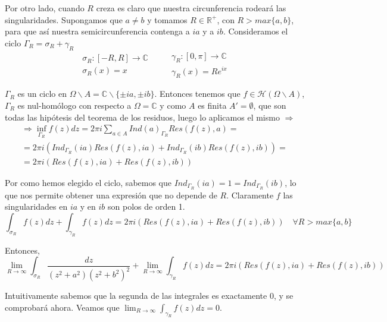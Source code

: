 \documentclass{article}
\begin{document}
Por otro lado, cuando $R$ creza es claro que nuestra circunferencia rodeará las singularidades. Supongamos que $a\neq b$ y tomamos $R\in \mathbb{R}^+$, con $R>max\{a,b\}$, para que así nuestra semicircunferencia contenga a $ia$ y a $ib$. Consideramos el ciclo $\Gamma_R=\sigma_R+\gamma_R$
\begin{equation*}
\left.\begin{array}{c}
\sigma_{R}:[-R,R]\longrightarrow \mathbb{C}\\
\sigma_{R}(x)=x
\end{array}\right.\qquad \left.\begin{array}{c}
\gamma_{R}:[0,\pi]\longrightarrow \mathbb{C}\\
\gamma_{R}(x)=Re^{ix}
\end{array}\right.
\end{equation*}

$\Gamma_R$ es un ciclo en $\Omega\backslash A=\mathbb{C}\backslash \{\pm ia,\pm ib\}$. Entonces tenemos que $f\in \mathcal{H}(\Omega\backslash A)$, $\Gamma_R$ es nul-homólogo con respecto a $\Omega=\mathbb{C}$ y como $A$ es finita $A'=\emptyset$, que son todas las hipótesis del teorema de los residuos, luego lo aplicamos el mismo $\Rightarrow$
\begin{gather*}
\Rightarrow \inf_{\Gamma_R}f(z)dz=2\pi i\sum_{a\in A}Ind(a)_{\Gamma_R}Res(f(z),a)=\\
=2\pi i(Ind_{\Gamma_R}(ia)Res(f(z),ia)+Ind_{\Gamma_R}(ib)Res(f(z),ib))=\\
=2\pi i(Res(f(z),ia)+Res(f(z),ib))
\end{gather*}

Por como hemos elegido el ciclo, sabemos que $Ind_{\Gamma_R}(ia)=1=Ind_{\Gamma_R}(ib)$, lo que nos permite obtener una expresión que no depende de $R$. Claramente $f$ las singularidades en $ia$ y en $ib$ son polos de orden 1.
\begin{equation*}
\int_{\sigma_R}f(z)dz+\int_{\gamma_R}f(z)dz=2\pi i(Res(f(z),ia)+Res(f(z),ib))\quad \forall R>max\{a,b\}
\end{equation*}

Entonces,
\begin{equation*}
\lim_{R\to\infty}\int_{\sigma_R}\frac{dz}{(z^2+a^2)(z^2+b^2)^2}+\lim_{R\to\infty}\int_{\gamma_R}f(z)dz=2\pi i(Res(f(z),ia)+Res(f(z),ib)) \label{(1)}
\end{equation*}

Intuitivamente sabemos que la segunda de las integrales es exactamente 0, y se comprobará ahora. Veamos que $\lim_{R\to\infty}\int_{\gamma_R}f(z)dz=0$.
\end{document}
